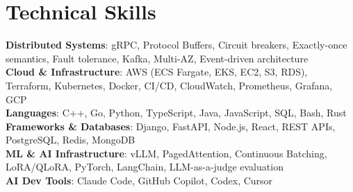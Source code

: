\documentclass[letterpaper,11pt]{article}
\begin{document}
\section{Technical Skills}
\vspace{-7pt}
\begin{itemize}
[leftmargin=0.15in, label={}]\small{\item{
        \textbf{Distributed Systems}{: gRPC, Protocol Buffers, Circuit breakers, Exactly-once semantics, Fault tolerance, Kafka, Multi-AZ, Event-driven architecture} \\
        \textbf{Cloud \& Infrastructure}{: AWS (ECS Fargate, EKS, EC2, S3, RDS), Terraform, Kubernetes, Docker, CI/CD, CloudWatch, Prometheus, Grafana, GCP} \\
        \textbf{Languages}{: C++, Go, Python, TypeScript, Java, JavaScript, SQL, Bash, Rust} \\
        \textbf{Frameworks \& Databases}{: Django, FastAPI, Node.js, React, REST APIs, PostgreSQL, Redis, MongoDB} \\
        \textbf{ML \& AI Infrastructure}{: vLLM, PagedAttention, Continuous Batching, LoRA/QLoRA, PyTorch, LangChain, LLM-as-a-judge evaluation} \\
        \textbf{AI Dev Tools}{: Claude Code, GitHub Copilot, Codex, Cursor} \\
}}
\end{itemize}
\end{document}
